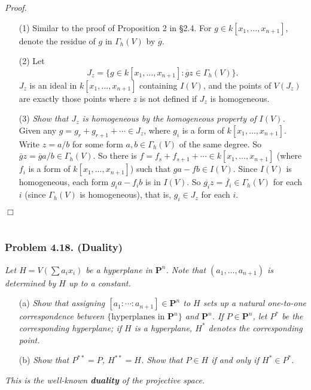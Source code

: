 \documentclass{article}
\begin{document}
\emph{Proof.}
\begin{enumerate}
\item[(1)]
  Similar to the proof of Proposition 2 in \S 2.4.
  For $g \in k[x_1, \ldots, x_{n+1}]$,
  denote the residue of $g$ in $\Gamma_h(V)$ by $\overline{g}$.

\item[(2)]
  Let
  \[
    J_z = \{ g \in k[x_1, \ldots, x_{n+1}] : \overline{g}z \in \Gamma_h(V) \}.
  \]
  $J_z$ is an ideal in $k[x_1, \ldots, x_{n+1}]$ containing $I(V)$,
  and the points of $V(J_z)$ are exactly those points where $z$ is not defined
  if $J_z$ is homogeneous.

\item[(3)]
  \emph{Show that $J_z$ is homogeneous by the homogeneous property of $I(V)$.}
  Given any $g = g_r + g_{r+1} + \cdots \in J_z$,
  where $g_i$ is a form of $k[x_1, \ldots, x_{n+1}]$.
  Write $z = a/b$ for some form $a, b \in \Gamma_h(V)$ of the same degree.
  So $\overline{g}z = \overline{g} a/b \in \Gamma_h(V)$.
  So there is $f = f_s + f_{s+1} + \cdots \in k[x_1, \ldots, x_{n+1}]$
  (where $f_i$ is a form of $k[x_1, \ldots, x_{n+1}]$)
  such that $ga - fb \in I(V)$.
  Since $I(V)$ is homogeneous, each form $g_i a - f_i b$ is in $I(V)$.
  So $\overline{g_i} z = \overline{f_i} \in \Gamma_h(V)$ for each $i$
  (since $\Gamma_h(V)$ is homogeneous), that is, $g_i \in J_z$ for each $i$.
\end{enumerate}
$\Box$ \\\\






\subsubsection*{Problem 4.18. (Duality)}
\emph{Let $H = V\left( \sum a_i x_i \right)$ be a hyperplane in $\mathbf{P}^n$.
Note that $(a_1, \ldots, a_{n+1})$ is determined by $H$ up to a constant.}
\begin{enumerate}
\item[(a)]
  \emph{Show that assigning $[a_1 : \cdots : a_{n+1}] \in \mathbf{P}^n$ to $H$
  sets up a natural one-to-one correspondence between
  $\{ \text{hyperplanes in $\mathbf{P}^n$} \}$ and $\mathbf{P}^n$.
  If $P \in \mathbf{P}^n$,
  let $P^{*}$ be the corresponding hyperplane;
  if $H$ is a hyperplane, $H^{*}$ denotes the corresponding point.}

\item[(b)]
  \emph{Show that $P^{**} = P$, $H^{**} = H$.
  Show that $P \in H$ if and only if $H^{*} \in P^{*}$.}
\end{enumerate}
\emph{This is the well-known \textbf{duality} of the projective space.} \\
\end{document}
